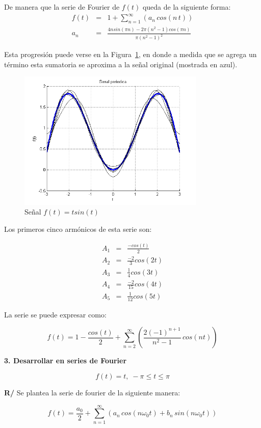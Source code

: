 \documentclass[twocolumn]{article}
\begin{document}
De manera que la serie de Fourier de $f(t)$ queda de la siguiente forma:
\begin{eqnarray*}
f(t) &=& 1 + \sum_{n=1}^\infty\left(a_n\,cos(n\,t)\right)\\
a_n &=& \frac{4nsin(\pi n)-2\pi(n^{2}-1)cos(\pi n)}{\pi(n^{2}- 1)^{2}}
\end{eqnarray*}

Esta progresión puede verse en la Figura~\ref{fig_1b}, en donde a medida que se agrega un término esta sumatoria se aproxima a la señal original (mostrada en azul).

\begin{figure}[!t]
\centering
\includegraphics[width=3.5in]{imgs/tsint.png}
\caption{Señal $f(t) = tsin(t)$}
\label{fig_1b}
\end{figure}

Los primeros cinco armónicos de esta serie son:

\begin{eqnarray*}
A_1 &=& \frac{-cos(t)}{2} \\
A_2 &=& \frac{-2}{3} cos(2t) \\
A_3 &=& \frac{1}{4} cos(3t) \\
A_4 &=& \frac{-2}{15} cos(4t) \\
A_5 &=& \frac{1}{12} cos(5t)
\end{eqnarray*}

La serie se puede expresar como:

$$f(t) = 1 - \frac{cos(t)}{2} + \sum_{n=2}^\infty\left( \frac{2(-1)^{n+1}}{n^2 - 1} \,cos(n t) \right)$$


\textbf{3. Desarrollar en series de Fourier}

$$f(t) = t,\; -\pi \leq t \leq \pi$$

\textbf{R/} Se plantea la serie de fourier de la siguiente manera:

$$f(t) = \frac{a_0}{2} + \sum_{n=1}^\infty\left(a_n\,cos(n\omega_0t) + b_n\,sin(n\omega_0t)\right)$$
\end{document}
